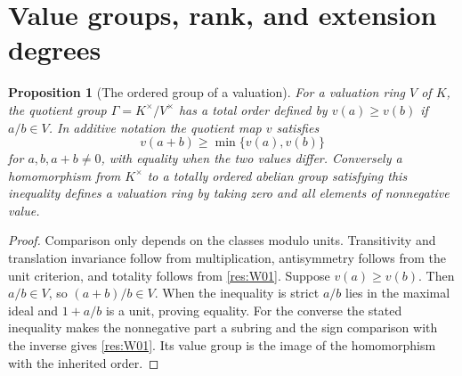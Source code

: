 \documentclass[11pt,oneside,openany]{book}
\newtheorem{proposition}[theorem]{Proposition}
\theoremstyle{definition}
\theoremstyle{remark}
\begin{document}
\section[Value groups and rank]{Value groups, rank, and extension degrees}

\begin{proposition}[The ordered group of a valuation]\label{res:W04}
For a valuation ring \(V\) of \(K\), the quotient group \(\Gamma=K^\times/V^\times\) has a total order defined by \(v(a)\ge v(b)\) if \(a/b\in V\). In additive notation the quotient map \(v\) satisfies
\[
                  v(a+b)\ge\min\{v(a),v(b)\}
\]
for \(a,b,a+b\ne0\), with equality when the two values differ. Conversely a homomorphism from \(K^\times\) to a totally ordered abelian group satisfying this inequality defines a valuation ring by taking zero and all elements of nonnegative value.
\end{proposition}
\begin{proof}
Comparison only depends on the classes modulo units. Transitivity and translation invariance follow from multiplication, antisymmetry follows from the unit criterion, and totality follows from \ref{res:W01}. Suppose \(v(a)\ge v(b)\). Then \(a/b\in V\), so \((a+b)/b\in V\). When the inequality is strict \(a/b\) lies in the maximal ideal and \(1+a/b\) is a unit, proving equality. For the converse the stated inequality makes the nonnegative part a subring and the sign comparison with the inverse gives \ref{res:W01}. Its value group is the image of the homomorphism with the inherited order.
\end{proof}
\end{document}
